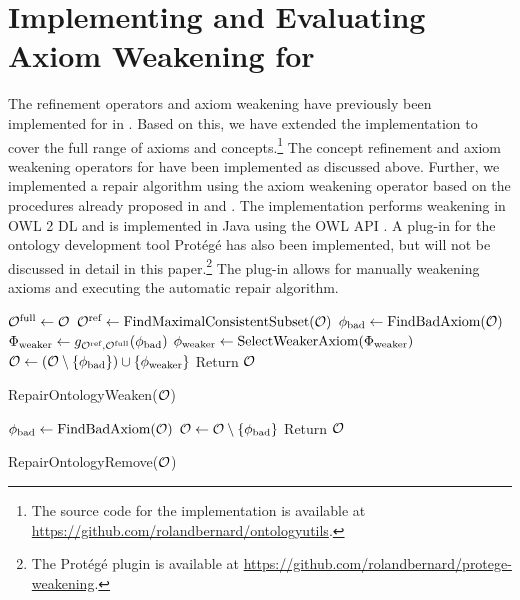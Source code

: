\documentclass[
]{ceurart}
\begin{document}
\section{Implementing and Evaluating Axiom Weakening for \SROIQ}

The refinement operators and axiom weakening have previously been implemented for \ALC in \cite{troquard2018repairing}. Based on this, we have extended the implementation to cover the full range of \SROIQ axioms and concepts.\footnote{The source code for the implementation is available at \url{https://github.com/rolandbernard/ontologyutils}.} The concept refinement and axiom weakening operators for \SROIQ have been implemented as discussed above. Further, we implemented a repair algorithm using the axiom weakening operator based on the procedures already proposed in \cite{troquard2018repairing} and \cite{confalonieri2020towards}. The implementation performs weakening in OWL 2 DL \cite{motik2012ontology} and is implemented in Java using the OWL API \cite{horridge2011owl}. A plug-in for the ontology development tool Protégé has also been implemented, but will not be discussed in detail in this paper.\footnote{The Protégé plugin is available at \url{https://github.com/rolandbernard/protege-weakening}.} The plug-in allows for manually weakening axioms and executing the automatic repair algorithm.

\hskip -3.5mm
\begin{minipage}[t]{.5\textwidth}
  \begin{algorithm}[H]
    \begin{algorithmic}
      \State ${\mathcal{O}^\textnormal{full}} \gets \mathcal{O}$
      \State ${\mathcal{O}^\textnormal{ref}} \gets \textnormal{FindMaximalConsistentSubset(\ensuremath{\mathcal{O}})}$
        \State $\phi_\textnormal{bad} \gets \textnormal{FindBadAxiom}(\mathcal{O})$
        \State $\Phi_\textnormal{weaker} \gets g_{{\mathcal{O}^\textnormal{ref}},{\mathcal{O}^\textnormal{full}}}(\phi_\textnormal{bad})$
        \State $\phi_\textnormal{weaker} \gets \textnormal{SelectWeakerAxiom}(\Phi_\textnormal{weaker})$
        \State $\mathcal{O} \gets (\mathcal{O} \setminus \{\phi_\textnormal{bad}\}) \cup \{\phi_\textnormal{weaker}\}$
      \EndWhile
      \State Return $\mathcal{O}$
    \end{algorithmic}
    \caption{RepairOntologyWeaken($\mathcal{O}$)}
    \label{algo:repair-weaken}
  \end{algorithm}
\end{minipage}
\hfill
\begin{minipage}[t]{.45\textwidth}
  \begin{algorithm}[H]
    \footnotesize
    \begin{algorithmic}
        \State $\phi_\textnormal{bad} \gets \textnormal{FindBadAxiom}(\mathcal{O})$
        \State $\mathcal{O} \gets \mathcal{O} \setminus \{\phi_\textnormal{bad}\}$
      \EndWhile
      \State Return $\mathcal{O}$
    \end{algorithmic}
    \caption{RepairOntologyRemove($\mathcal{O}$)}
    \label{algo:repair-remove}
  \end{algorithm}
\end{minipage}
\vskip 4mm
\end{document}
